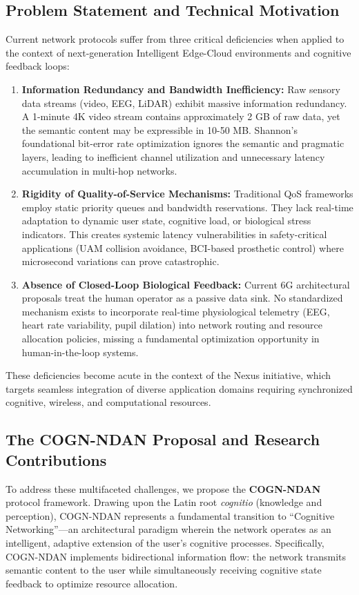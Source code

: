 \documentclass[journal]{IEEEtran}
\newcommand{\COGN}{COGN-NDAN}
\begin{document}
\subsection{Problem Statement and Technical Motivation}
Current network protocols suffer from three critical deficiencies when applied to the context of next-generation Intelligent Edge-Cloud environments and cognitive feedback loops:
\begin{enumerate}
    \item \textbf{Information Redundancy and Bandwidth Inefficiency:} Raw sensory data streams (video, EEG, LiDAR) exhibit massive information redundancy. A 1-minute 4K video stream contains approximately 2 GB of raw data, yet the semantic content may be expressible in 10-50 MB. Shannon's foundational bit-error rate optimization ignores the semantic and pragmatic layers, leading to inefficient channel utilization and unnecessary latency accumulation in multi-hop networks.
    \item \textbf{Rigidity of Quality-of-Service Mechanisms:} Traditional QoS frameworks employ static priority queues and bandwidth reservations. They lack real-time adaptation to dynamic user state, cognitive load, or biological stress indicators. This creates systemic latency vulnerabilities in safety-critical applications (UAM collision avoidance, BCI-based prosthetic control) where microsecond variations can prove catastrophic.
    \item \textbf{Absence of Closed-Loop Biological Feedback:} Current 6G architectural proposals treat the human operator as a passive data sink. No standardized mechanism exists to incorporate real-time physiological telemetry (EEG, heart rate variability, pupil dilation) into network routing and resource allocation policies, missing a fundamental optimization opportunity in human-in-the-loop systems.
\end{enumerate}

These deficiencies become acute in the context of the Nexus initiative, which targets seamless integration of diverse application domains requiring synchronized cognitive, wireless, and computational resources.

\subsection{The COGN-NDAN Proposal and Research Contributions}
To address these multifaceted challenges, we propose the \textbf{COGN-NDAN} protocol framework. Drawing upon the Latin root \textit{cognitio} (knowledge and perception), \COGN{} represents a fundamental transition to ``Cognitive Networking''—an architectural paradigm wherein the network operates as an intelligent, adaptive extension of the user's cognitive processes. Specifically, \COGN{} implements bidirectional information flow: the network transmits semantic content to the user while simultaneously receiving cognitive state feedback to optimize resource allocation.
\end{document}
